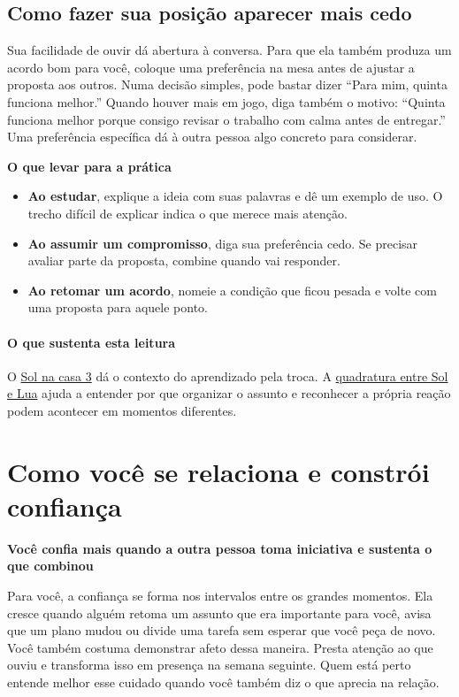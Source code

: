 \documentclass[11pt,a4paper]{article}
\newcommand{\subtituloleitura}[1]{\textbf{#1}\par\nopagebreak[4]}
\begin{document}
\subsection*{Como fazer sua posição aparecer mais cedo}

Sua facilidade de ouvir dá abertura à conversa. Para que ela também produza um acordo bom para você, coloque uma preferência na mesa antes de ajustar a proposta aos outros. Numa decisão simples, pode bastar dizer “Para mim, quinta funciona melhor.” Quando houver mais em jogo, diga também o motivo: “Quinta funciona melhor porque consigo revisar o trabalho com calma antes de entregar.” Uma preferência específica dá à outra pessoa algo concreto para considerar.

\subtituloleitura{O que levar para a prática}
\begin{itemize}
\item \textbf{Ao estudar}, explique a ideia com suas palavras e dê um exemplo de uso. O trecho difícil de explicar indica o que merece mais atenção.
\item \textbf{Ao assumir um compromisso}, diga sua preferência cedo. Se precisar avaliar parte da proposta, combine quando vai responder.
\item \textbf{Ao retomar um acordo}, nomeie a condição que ficou pesada e volte com uma proposta para aquele ponto.
\end{itemize}

\paragraph*{O que sustenta esta leitura} O \hyperref[pos-sol]{Sol na casa 3} dá o contexto do aprendizado pela troca. A \hyperref[aspecto:sol-lua]{quadratura entre Sol e Lua} ajuda a entender por que organizar o assunto e reconhecer a própria reação podem acontecer em momentos diferentes.
\clearpage
\section{Como você se relaciona e constrói confiança}
\subtituloleitura{Você confia mais quando a outra pessoa toma iniciativa e sustenta o que combinou}

Para você, a confiança se forma nos intervalos entre os grandes momentos. Ela cresce quando alguém retoma um assunto que era importante para você, avisa que um plano mudou ou divide uma tarefa sem esperar que você peça de novo. Você também costuma demonstrar afeto dessa maneira. Presta atenção ao que ouviu e transforma isso em presença na semana seguinte. Quem está perto entende melhor esse cuidado quando você também diz o que aprecia na relação.
\end{document}
